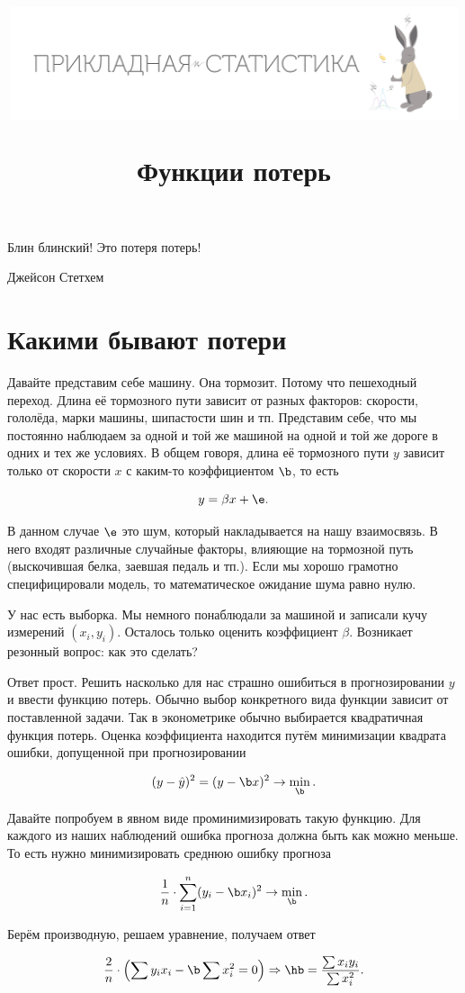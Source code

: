 \documentclass[12pt, a4paper, oneside]{article}
\title{\begin{center} \includegraphics[width=0.99\textwidth]{logo.png} \end{center}  Функции потерь}
\date{ } %
\begin{document}
\maketitle

\epigraph{\hspace{3cm} Блин блинский! Это потеря потерь!}{Джейсон Стетхем}

\section{Какими бывают потери} 

Давайте представим себе машину. Она тормозит. Потому что пешеходный переход. Длина её тормозного пути зависит от разных факторов: скорости, гололёда, марки машины, шипастости шин и тп. Представим себе, что мы постоянно наблюдаем за одной и той же машиной на одной и той же дороге в одних и тех же условиях. В общем говоря, длина её тормозного пути $y$ зависит только от скорости $x$ с каким-то коэффициентом $\b$, то есть 

\[ y = \beta x + \e. \]

В данном случае $\e$ это шум, который накладывается на нашу взаимосвязь. В него входят различные случайные факторы, влияющие на тормозной путь (выскочившая белка, заевшая педаль и тп.).  Если мы хорошо грамотно специфицировали модель, то математическое ожидание шума равно нулю. 

У нас есть выборка. Мы немного понаблюдали за машиной и записали кучу измерений $(x_i, y_i)$. Осталось только оценить коэффициент $\beta$.  Возникает резонный вопрос: как это сделать?

Ответ прост. Решить насколько для нас страшно ошибиться в прогнозировании $y$ и ввести функцию потерь. Обычно выбор конкретного вида функции зависит от поставленной задачи.  Так в эконометрике обычно выбирается квадратичная функция потерь. Оценка коэффициента находится путём минимизации квадрата ошибки, допущенной при прогнозировании

\[ (y - \hat y)^2 = (y - \b x)^2 \to \min_{\b}. \]

Давайте попробуем в явном виде проминимизировать такую функцию. Для каждого из наших наблюдений ошибка прогноза должна быть как можно меньше. То есть нужно минимизировать среднюю ошибку прогноза 

\[  \frac{1}{n} \cdot \sum_{i=1}^n(y_i - \b x_i)^2  \to \min_{\b}.  \]

Берём производную, решаем уравнение, получаем ответ

\begin{equation*}
\frac{2}{n} \cdot \left(\sum y_i x_i - \b \sum x_i^2  = 0 \right) \Rightarrow \hb = \frac{\sum x_i y_i}{\sum x_i^2}.
\end{equation*}
\end{document}
